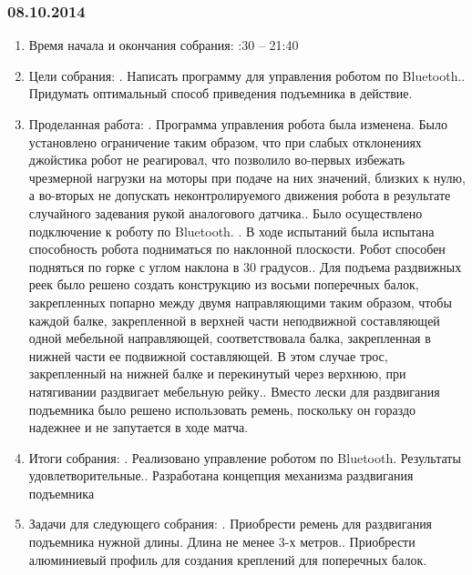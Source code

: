 \documentclass[11pt]{article}
\begin{document}
         \subsubsection{08.10.2014}
         \begin{enumerate}
            \item Время начала и окончания собрания:
            :30 – 21:40
            \item Цели собрания:
            .   Написать программу для управления роботом по Bluetooth..   Придумать оптимальный способ приведения подъемника в действие.\newline
            \item Проделанная работа:
            .   Программа управления робота была изменена. Было установлено ограничение таким образом, что при слабых отклонениях джойстика робот не реагировал, что позволило во-первых избежать чрезмерной нагрузки на моторы при подаче на них значений, близких к нулю, а во-вторых не допускать неконтролируемого движения робота в результате случайного задевания рукой аналогового датчика..   Было осуществлено подключение к роботу по Bluetooth. .   В ходе испытаний была испытана способность робота подниматься по наклонной плоскости. Робот  способен подняться по горке с углом наклона в 30 градусов..   Для подъема раздвижных реек было решено создать конструкцию из восьми поперечных балок, закрепленных попарно между двумя направляющими таким образом, чтобы каждой балке, закрепленной в верхней части неподвижной составляющей одной мебельной направляющей, соответствовала балка, закрепленная в нижней части ее подвижной составляющей. В этом случае трос, закрепленный на нижней балке и перекинутый через верхнюю, при натягивании раздвигает мебельную рейку..   Вместо лески для раздвигания подъемника было решено использовать ремень, поскольку он гораздо надежнее и не запутается в ходе матча.
            \newline
            \item Итоги собрания:
            .   Реализовано управление роботом по Bluetooth. Результаты удовлетворительные..   Разработана концепция механизма раздвигания подъемника
            \newline
            \item Задачи для следующего собрания:
            .   Приобрести ремень для раздвигания подъемника нужной длины. Длина не менее 3-х метров..   Приобрести алюминиевый профиль для создания креплений для поперечных балок.            
         \end{enumerate}
         \newpage
\end{document}
